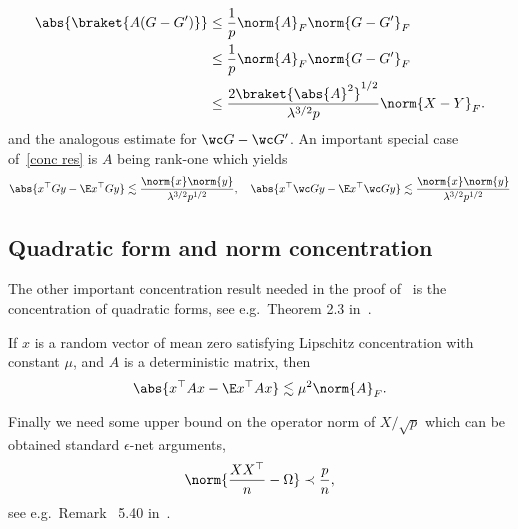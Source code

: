 \begin{equation}
\begin{aligned}
    \abs{\braket{A (G-G')}} &\le \frac{1}{p} \norm{A}_F \norm{G-G'}_F \\
    &\le \frac{1}{p} \norm{A}_F \norm{G-G'}_F \\
    &\le \frac{2\braket{\abs{A}^2}^{1/2}}{\lambda^{3/2}p}\norm{X-Y}_F.
\end{aligned}
\end{equation}
and the analogous estimate for $\wc G-\wc G'$.
An important special case of~\cref{conc res} is $A$ being rank-one which yields
\begin{equation}\label{conc res xy}
    \abs{x^\top G y - \E x^\top G y} \lesssim \frac{\norm{x}\norm{y}}{\lambda^{3/2}p^{1/2}}, \quad \abs{x^\top \wc G y - \E x^\top \wc G y} \lesssim \frac{\norm{x}\norm{y}}{\lambda^{3/2}p^{1/2}}
\end{equation}

\subsection*{Quadratic form and norm concentration}
The other important concentration result needed in the proof of~ is the concentration of quadratic forms, see e.g.\ Theorem 2.3 in~\cite{adamczak2015note}.
\begin{theorem}
\label{thm:hanson_wright}
    If $x$ is a random vector of mean zero satisfying Lipschitz concentration with constant $\mu$, and $A$ is a deterministic matrix, then
    \begin{equation}
        \abs{x^\top A x - \E x^\top A x} \lesssim \mu^2 \norm{A}_F.
    \end{equation}
\end{theorem}

Finally we need some upper bound on the operator norm of $X/\sqrt{p}$ which can be obtained standard $\epsilon$-net arguments,
\begin{equation}\label{XX norm bound}
    \norm{\frac{XX^\top}{n}- \Omega}\prec \frac{p}{n},
\end{equation}
see e.g.\ Remark~ 5.40 in~\cite{1011.3027}.


